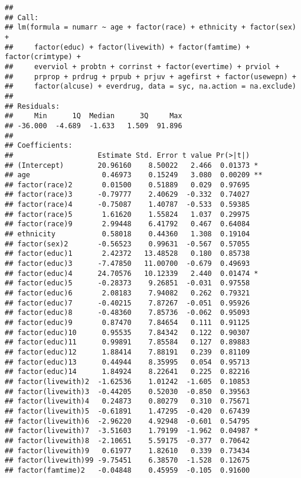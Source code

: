 \documentclass[]{article}
\begin{document}
{\begin{verbatim}
## 
## Call:
## lm(formula = numarr ~ age + factor(race) + ethnicity + factor(sex) + 
##     factor(educ) + factor(livewith) + factor(famtime) + factor(crimtype) + 
##     everviol + probtn + corrinst + factor(evertime) + prviol + 
##     prprop + prdrug + prpub + prjuv + agefirst + factor(usewepn) + 
##     factor(alcuse) + everdrug, data = syc, na.action = na.exclude)
## 
## Residuals:
##     Min      1Q  Median      3Q     Max 
## -36.000  -4.689  -1.633   1.509  91.896 
## 
## Coefficients:
##                    Estimate Std. Error t value Pr(>|t|)    
## (Intercept)        20.96160    8.50022   2.466  0.01373 *  
## age                 0.46973    0.15249   3.080  0.00209 ** 
## factor(race)2       0.01500    0.51889   0.029  0.97695    
## factor(race)3      -0.79777    2.40629  -0.332  0.74027    
## factor(race)4      -0.75087    1.40787  -0.533  0.59385    
## factor(race)5       1.61620    1.55824   1.037  0.29975    
## factor(race)9       2.99448    6.41792   0.467  0.64084    
## ethnicity           0.58018    0.44360   1.308  0.19104    
## factor(sex)2       -0.56523    0.99631  -0.567  0.57055    
## factor(educ)1       2.42372   13.48528   0.180  0.85738    
## factor(educ)3      -7.47850   11.00700  -0.679  0.49693    
## factor(educ)4      24.70576   10.12339   2.440  0.01474 *  
## factor(educ)5      -0.28373    9.26851  -0.031  0.97558    
## factor(educ)6       2.08183    7.94082   0.262  0.79321    
## factor(educ)7      -0.40215    7.87267  -0.051  0.95926    
## factor(educ)8      -0.48360    7.85736  -0.062  0.95093    
## factor(educ)9       0.87470    7.84654   0.111  0.91125    
## factor(educ)10      0.95535    7.84342   0.122  0.90307    
## factor(educ)11      0.99891    7.85584   0.127  0.89883    
## factor(educ)12      1.88414    7.88191   0.239  0.81109    
## factor(educ)13      0.44944    8.35995   0.054  0.95713    
## factor(educ)14      1.84924    8.22641   0.225  0.82216    
## factor(livewith)2  -1.62536    1.01242  -1.605  0.10853    
## factor(livewith)3  -0.44205    0.52030  -0.850  0.39563    
## factor(livewith)4   0.24873    0.80279   0.310  0.75671    
## factor(livewith)5  -0.61891    1.47295  -0.420  0.67439    
## factor(livewith)6  -2.96220    4.92948  -0.601  0.54795    
## factor(livewith)7  -3.51603    1.79199  -1.962  0.04987 *  
## factor(livewith)8  -2.10651    5.59175  -0.377  0.70642    
## factor(livewith)9   0.61977    1.82610   0.339  0.73434    
## factor(livewith)99 -9.75451    6.38570  -1.528  0.12675    
## factor(famtime)2   -0.04848    0.45959  -0.105  0.91600    

\end{verbatim}}
\end{document}
